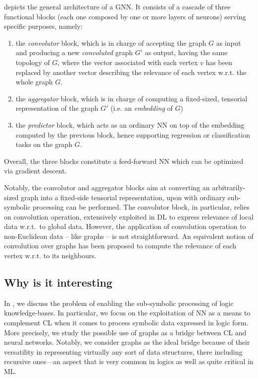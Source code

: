 \documentclass[12pt,a4paper,openright,twoside]{book}
\begin{document}
 depicts the general architecture of a GNN.
%
It consists of a cascade of three functional blocks (each one composed by one or more layers of neurons) serving specific purposes, namely:
%
\begin{enumerate}
    \item the \emph{convolutor} block, which is in charge of accepting the graph $G$ as input and producing a new \emph{convoluted} graph $G'$ as output, having the same topology of $G$, where the vector associated with each vertex $v$ has been replaced by another vector describing the relevance of each vertex w.r.t. the whole graph $G$.

    \item the \emph{aggregator} block, which is in charge of computing a fixed-sized, tensorial representation of the graph $G'$ (i.e. an \emph{embedding} of $G$)

    \item the \emph{predictor} block, which acts as an ordinary NN on top of the embedding computed by the previous block, hence supporting regression or classification tasks on the graph $G$.
\end{enumerate}
%
Overall, the three blocks constitute a feed-forward NN which can be optimized via gradient descent.

Notably, the convolutor and aggregator blocks aim at converting an arbitrarily-sized graph into a fixed-side tensorial representation, upon with ordinary sub-symbolic processing can be performed.
%
The convolutor block, in particular, relies on convolution operation, extensively exploited in DL to express relevance of local data w.r.t.\ to global data.
%
However, the application of convolution operation to non-Euclidean data -- like graphs -- is not straightforward.
%
An equivalent notion of convolution over graphs has been proposed to compute the relevance of each vertex w.r.t. to its neighbours.

\subsection{Why is it interesting}

In \cite{gnn-woa2021}, we discuss the problem of enabling the sub-symbolic processing of logic knowledge-bases.
%
In particular, we focus on the exploitation of NN as a means to complement CL when it comes to process symbolic data expressed in logic form.
%
More precisely, we study the possible use of graphs as a bridge between CL and neural networks.
%
Notably, we consider graphs as the ideal bridge because of their versatility in representing virtually any sort of data structures, there including recursive ones---an aspect that is very common in logics as well as quite critical in ML.
\end{document}

